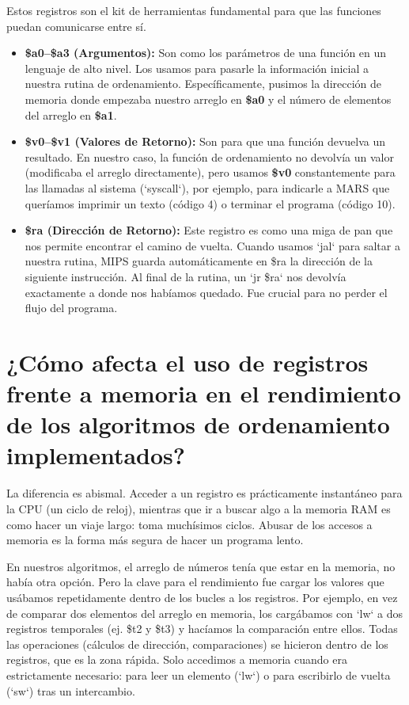 \documentclass{article}
\begin{document}
\indent\indent Estos registros son el kit de herramientas fundamental para que las funciones puedan comunicarse entre sí.
\begin{itemize}
    \item \textbf{\$a0–\$a3 (Argumentos):} Son como los parámetros de una función en un lenguaje de alto nivel. Los usamos para pasarle la información inicial a nuestra rutina de ordenamiento. Específicamente, pusimos la dirección de memoria donde empezaba nuestro arreglo en \textbf{\$a0} y el número de elementos del arreglo en \textbf{\$a1}.
    \item \textbf{\$v0–\$v1 (Valores de Retorno):} Son para que una función devuelva un resultado. En nuestro caso, la función de ordenamiento no devolvía un valor (modificaba el arreglo directamente), pero usamos \textbf{\$v0} constantemente para las llamadas al sistema (`syscall`), por ejemplo, para indicarle a MARS que queríamos imprimir un texto (código 4) o terminar el programa (código 10).
    \item \textbf{\$ra (Dirección de Retorno):} Este registro es como una miga de pan que nos permite encontrar el camino de vuelta. Cuando usamos `jal` para saltar a nuestra rutina, MIPS guarda automáticamente en \$ra la dirección de la siguiente instrucción. Al final de la rutina, un `jr \$ra` nos devolvía exactamente a donde nos habíamos quedado. Fue crucial para no perder el flujo del programa.
\end{itemize}

\section{¿Cómo afecta el uso de registros frente a memoria en el rendimiento de los algoritmos de ordenamiento implementados?}
\indent\indent La diferencia es abismal. Acceder a un registro es prácticamente instantáneo para la CPU (un ciclo de reloj), mientras que ir a buscar algo a la memoria RAM es como hacer un viaje largo: toma muchísimos ciclos. Abusar de los accesos a memoria es la forma más segura de hacer un programa lento.\newline

\noindent En nuestros algoritmos, el arreglo de números tenía que estar en la memoria, no había otra opción. Pero la clave para el rendimiento fue cargar los valores que usábamos repetidamente dentro de los bucles a los registros. Por ejemplo, en vez de comparar dos elementos del arreglo en memoria, los cargábamos con `lw` a dos registros temporales (ej. \$t2 y \$t3) y hacíamos la comparación entre ellos. Todas las operaciones (cálculos de dirección, comparaciones) se hicieron dentro de los registros, que es la zona rápida. Solo accedimos a memoria cuando era estrictamente necesario: para leer un elemento (`lw`) o para escribirlo de vuelta (`sw`) tras un intercambio.
\end{document}
